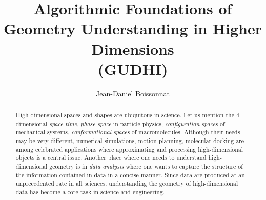 \documentclass[a4paper, 11pt]{article}
\begin{document}
\title{Algorithmic Foundations of \\%
Geometry Understanding in Higher Dimensions\\ (GUDHI)}
\author{Jean-Daniel Boissonnat}

\maketitle

\begin{abstract}

High-dimensional spaces and shapes
are ubiquitous in science.  Let us mention the  4-dimensional {\em space-time},  {\em phase space} in particle physics, {\em configuration spaces} of mechanical systems, {\em conformational spaces} of macromolecules.  Although their needs may be very different, numerical simulations, motion planning, molecular docking are among celebrated applications where approximating and processing high-dimensional objects is a central issue. 
Another place where one needs to understand
high-dimensional geometry is in {\em data analysis} where one wants to
capture the structure of the information contained in data in a
concise manner.  %
Since data are produced at an unprecedented rate in all
sciences, understanding the geometry of high-dimensional data %
has become a core task in science and engineering.


\end{abstract}
\end{document}
